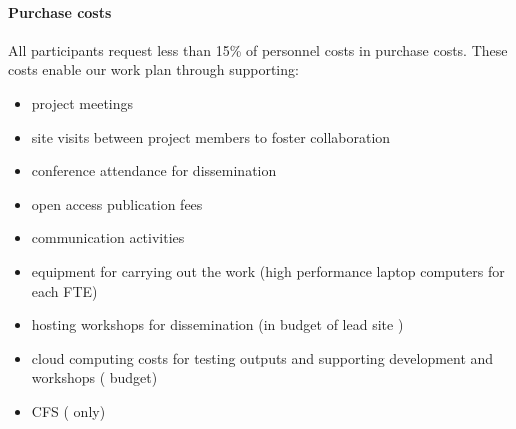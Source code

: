 \paragraph*{Purchase costs} All participants request less than 15\% of personnel costs in purchase costs.
These costs enable our work plan through supporting: 
\begin{itemize}[noitemsep]
\item project meetings
\item site visits between project members to foster collaboration
\item conference attendance for dissemination
\item open access publication fees
\item communication activities
\item equipment for carrying out the work (high performance laptop computers for each FTE)
\item hosting workshops for dissemination (in budget of lead site )
\item cloud computing costs for testing outputs and supporting development and workshops ( budget)
\item CFS ( only)
\end{itemize}


